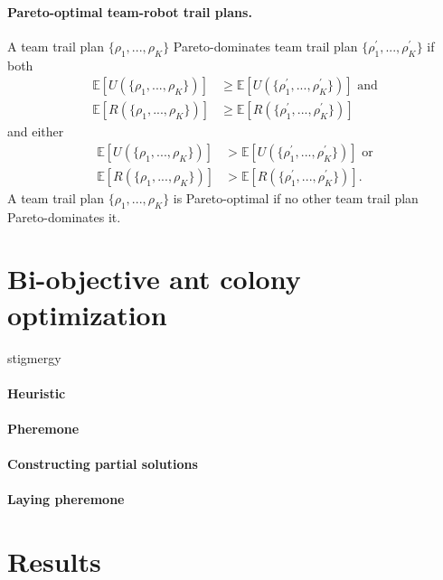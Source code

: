 \documentclass[11pt, oneside]{article}
\begin{document}
\paragraph{Pareto-optimal team-robot trail plans.} A team trail plan $\{\rho_1, ..., \rho_K\}$ Pareto-dominates team trail plan  $\{\rho_1^\prime, ..., \rho_K^\prime\}$ if both
\begin{align}
	\mathbb{E}[U(\{\rho_1, ..., \rho_K\})] & \geq \mathbb{E}[U(\{\rho_1^\prime, ..., \rho_K^\prime\})]  \text{ and} \\
	\mathbb{E}[R(\{\rho_1, ..., \rho_K\})] & \geq \mathbb{E}[R(\{\rho_1^\prime, ..., \rho_K^\prime\})] 
\end{align}
and either
\begin{align}
	\mathbb{E}[U(\{\rho_1, ..., \rho_K\})] &> \mathbb{E}[U(\{\rho_1^\prime, ..., \rho_K^\prime\})]  \text{ or} \\
	\mathbb{E}[R(\{\rho_1, ..., \rho_K\})] & > \mathbb{E}[R(\{\rho_1^\prime, ..., \rho_K^\prime\})] .
\end{align}
A team trail plan $\{\rho_1, ..., \rho_K\}$ is Pareto-optimal if no other team trail plan Pareto-dominates it.



\section{Bi-objective ant colony optimization}
stigmergy

\paragraph{Heuristic}

\paragraph{Pheremone}

\paragraph{Constructing partial solutions}

\paragraph{Laying pheremone}

\section{Results}
\end{document}
